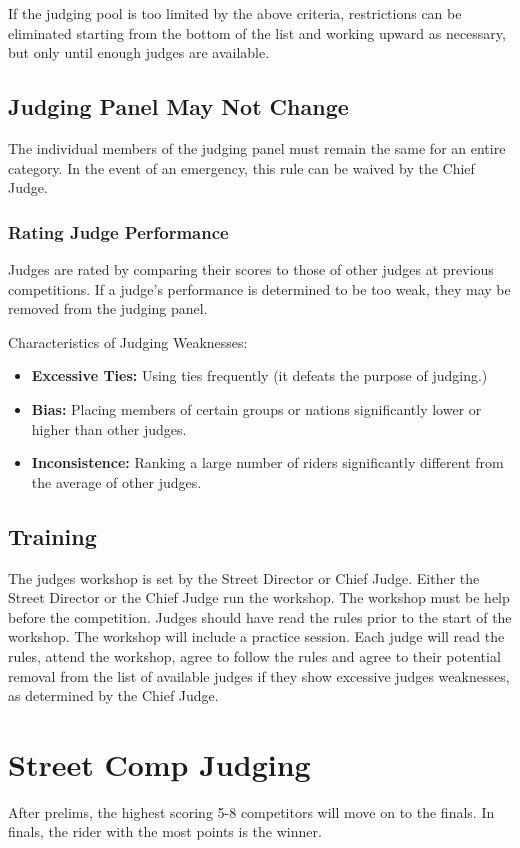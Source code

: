 If the judging pool is too limited by the above criteria, restrictions can be eliminated starting from the bottom of the list and working upward as necessary, but only until enough judges are available.

\subsection{Judging Panel May Not Change}

The individual members of the judging panel must remain the same for an entire category.
In the event of an emergency, this rule can be waived by the Chief Judge.

\subsubsection{Rating Judge Performance}
Judges are rated by comparing their scores to those of other judges at previous competitions.
If a judge's performance is determined to be too weak, they may be removed from the judging panel.

Characteristics of Judging Weaknesses:
\begin{itemize}
\item \textbf{Excessive Ties:}
Using ties frequently (it defeats the purpose of judging.)
\item \textbf{Bias:}
Placing members of certain groups or nations significantly lower or higher than other judges.
\item\textbf{Inconsistence:}
Ranking a large number of riders significantly different from the average of other judges.
\end{itemize}

\subsection{Training}
The judges workshop is set by the Street Director or Chief Judge.
Either the Street Director or the Chief Judge run the workshop.
The workshop must be help before the competition.
Judges should have read the rules prior to the start of the workshop.
The workshop will include a practice session.
Each judge will read the rules, attend the workshop, agree to follow the rules and agree to their potential removal from the list of available judges if they show excessive judges weaknesses, as determined by the Chief Judge.

\section{Street Comp Judging}
After prelims, the highest scoring 5-8 competitors will move on to the finals.
In finals, the rider with the most points is the winner.

